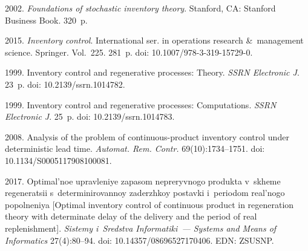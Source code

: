 


%

  

\vspace*{-10pt}

  \begin{multicols}{2}

\renewcommand{\bibname}{\protect\rmfamily References}

{\small\frenchspacing
 {\baselineskip=10.4pt
 \begin{thebibliography}{99} 
 
 \vspace*{-4pt}
 
 2002. \textit{Foundations of stochastic inventory theory}. Stanford, CA: Stanford Business Book. 320~p.

 2015. \textit{Inventory control}. 
International ser. in operations research \&~management science. Springer. Vol.~225. 281~p. doi: 10.1007/978-3-319-15729-0.



 1999. Inventory control and regenerative processes: Theory. \textit{SSRN Electronic J}. 23~p. doi: 10.2139/ssrn.1014782.

 1999. Inventory control and regenerative processes: Computations. \textit{SSRN Electronic J}. 25~p. doi: 10.2139/ssrn.1014783.

 2008. Analysis of the problem of continuous-product inventory control under deterministic lead time. 
  \textit{Automat. Rem. Contr.} 69(10):1734--1751. doi: 10.1134/S0005117908100081.

 2017. Optimal'noe upravleniye zapasom nepreryvnogo produkta v~skheme regeneratsii s~determinirovannoy zaderzhkoy postavki i~periodom real'nogo popolneniya  
 [Optimal inventory control of continuous product in regeneration theory with determinate delay of the delivery and the period of real replenishment]. 
 \textit{Sistemy i~Sredstva Informatiki~--- Systems and Means of Informatics} 27(4):80--94. doi: 10.14357/08696527170406. EDN: ZSUSNP.


\end{thebibliography}}}
\end{multicols}
